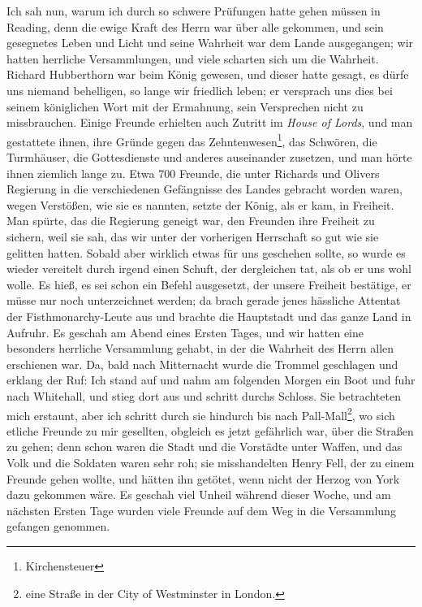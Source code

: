 Ich sah nun, warum ich durch so schwere Prüfungen hatte
gehen müssen in Reading, denn die ewige Kraft des Herrn war
über alle gekommen, und sein gesegnetes Leben und Licht und
seine Wahrheit war dem Lande ausgegangen; wir hatten herrliche 
Versammlungen, und viele scharten sich um die Wahrheit.
Richard Hubberthorn war beim König 
gewesen, und dieser hatte
gesagt, es dürfe uns niemand behelligen, so lange wir friedlich
leben; er versprach uns dies bei seinem königlichen Wort mit der
Ermahnung, sein Versprechen nicht zu missbrauchen. Einige
Freunde erhielten auch Zutritt im 
\textit{House of Lords}, und man
gestattete ihnen, ihre Gründe gegen das 
Zehntenwesen\footnote{Kirchensteuer}, 
das Schwören, die Turmhäuser, die Gottesdienste und anderes 
auseinander zusetzen, und man hörte ihnen ziemlich lange zu. Etwa 700 Freunde,
die unter Richards und Olivers Regierung in die verschiedenen
Gefängnisse des Landes gebracht worden waren, wegen Verstößen,
wie sie es nannten, setzte der König, als er kam, in Freiheit.
Man spürte, das die Regierung geneigt war, den Freunden ihre
Freiheit zu sichern, weil sie sah, das wir unter der vorherigen
Herrschaft so gut wie sie gelitten hatten. Sobald aber wirklich
etwas für uns geschehen sollte, so wurde es wieder vereitelt durch
irgend einen Schuft, der dergleichen tat, als ob er uns wohl
wolle. Es hieß, es sei schon ein Befehl ausgesetzt, der unsere
Freiheit bestätige, er müsse nur noch unterzeichnet werden; da
brach gerade jenes hässliche Attentat der 
Fisthmonarchy-Leute
aus und brachte die Hauptstadt und das ganze Land in Aufruhr.
Es geschah am Abend eines Ersten Tages, und wir hatten eine
besonders herrliche Versammlung gehabt, in der die Wahrheit
des Herrn allen erschienen war. Da, bald nach Mitternacht wurde
die Trommel geschlagen und erklang der Ruf:  Ich stand auf und nahm am folgenden Morgen
ein Boot und fuhr nach Whitehall, und stieg dort aus und schritt
durchs Schloss. Sie betrachteten mich erstaunt, aber ich schritt
durch sie hindurch bis nach Pall-Mall\footnote{eine Straße in der 
City of Westminster in London.}, wo sich etliche Freunde
zu mir gesellten, obgleich es jetzt gefährlich war, über die Straßen
zu gehen; denn schon waren die Stadt und die Vorstädte unter
Waffen, und das Volk und die Soldaten waren sehr roh; sie 
misshandelten Henry Fell, der zu einem Freunde gehen wollte, und
hätten ihn getötet, wenn nicht der Herzog von York dazu gekommen
wäre. Es geschah viel Unheil während dieser Woche, und am
nächsten Ersten Tage wurden viele Freunde auf dem Weg in die
Versammlung gefangen genommen.

